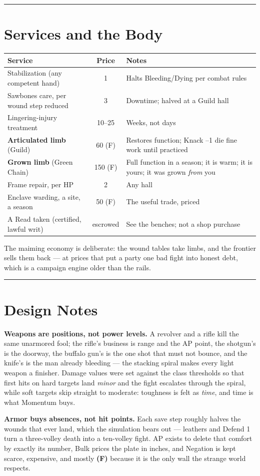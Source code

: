 \medskip\hrule\medskip

\section{Services and the Body}

\begin{center}
\small
\begin{tabular}{l|c|l}
\textbf{Service} & \textbf{Price} & \textbf{Notes} \\
\hline
Stabilization (any competent hand) & 1 & Halts Bleeding/Dying per combat rules \\
Sawbones care, per wound step reduced & 3 & Downtime; halved at a Guild hall \\
Lingering-injury treatment & 10--25 & Weeks, not days \\
\textbf{Articulated limb} (Guild) & 60 (F) & Restores function; Knack --1 die fine work until practiced \\
\textbf{Grown limb} (Green Chain) & 150 (F) & Full function in a season; it is warm; it is yours; it was grown \textit{from} you \\
Frame repair, per HP & 2 & Any hall \\
Enclave warding, a site, a season & 50 (F) & The useful trade, priced \\
A Read taken (certified, lawful writ) & escrowed & See the benches; not a shop purchase \\
\end{tabular}
\end{center}

The maiming economy is deliberate: the wound tables take limbs, and the frontier sells them back --- at prices that put a party one bad fight into honest debt, which is a campaign engine older than the rails.

\medskip\hrule\medskip

\section{Design Notes}

\textbf{Weapons are positions, not power levels.} A revolver and a rifle kill the same unarmored fool; the rifle's business is range and the AP point, the shotgun's is the doorway, the buffalo gun's is the one shot that must not bounce, and the knife's is the man already bleeding --- the stacking spiral makes every light weapon a finisher. Damage values were set against the class thresholds so that first hits on hard targets land \textit{minor} and the fight escalates through the spiral, while soft targets skip straight to moderate: toughness is felt as \textit{time}, and time is what Momentum buys.

\textbf{Armor buys absences, not hit points.} Each save step roughly halves the wounds that ever land, which the simulation bears out --- leathers and Defend 1 turn a three-volley death into a ten-volley fight. AP exists to delete that comfort by exactly its number, Bulk prices the plate in inches, and Negation is kept scarce, expensive, and mostly \textbf{(F)} because it is the only wall the strange world respects.
